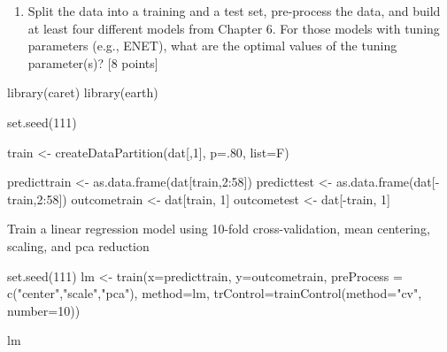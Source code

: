\documentclass[
]{article}
\newenvironment{Shaded}{\begin{snugshade}}{\end{snugshade}}
\newcommand{\AttributeTok}[1]{\textcolor[rgb]{0.77,0.63,0.00}{#1}}
\newcommand{\DecValTok}[1]{\textcolor[rgb]{0.00,0.00,0.81}{#1}}
\newcommand{\FunctionTok}[1]{\textcolor[rgb]{0.00,0.00,0.00}{#1}}
\newcommand{\NormalTok}[1]{#1}
\newcommand{\OtherTok}[1]{\textcolor[rgb]{0.56,0.35,0.01}{#1}}
\newcommand{\SpecialCharTok}[1]{\textcolor[rgb]{0.00,0.00,0.00}{#1}}
\newcommand{\StringTok}[1]{\textcolor[rgb]{0.31,0.60,0.02}{#1}}
\providecommand{\tightlist}{%
  \setlength{\itemsep}{0pt}\setlength{\parskip}{0pt}}
\begin{document}
\begin{enumerate}
\def\labelenumi{(\alph{enumi})}
\setcounter{enumi}{1}
\tightlist
\item
  Split the data into a training and a test set, pre-process the data,
  and build at least four different models from Chapter 6. For those
  models with tuning parameters (e.g., ENET), what are the optimal
  values of the tuning parameter(s)? {[}8 points{]}
\end{enumerate}

\begin{Shaded}
\begin{Highlighting}[]
\FunctionTok{library}\NormalTok{(caret)}
\FunctionTok{library}\NormalTok{(earth)}

\FunctionTok{set.seed}\NormalTok{(}\DecValTok{111}\NormalTok{)}

\NormalTok{train }\OtherTok{\textless{}{-}} \FunctionTok{createDataPartition}\NormalTok{(dat[,}\DecValTok{1}\NormalTok{], }\AttributeTok{p=}\NormalTok{.}\DecValTok{80}\NormalTok{, }\AttributeTok{list=}\NormalTok{F)}

\NormalTok{predicttrain }\OtherTok{\textless{}{-}} \FunctionTok{as.data.frame}\NormalTok{(dat[train,}\DecValTok{2}\SpecialCharTok{:}\DecValTok{58}\NormalTok{])}
\NormalTok{predicttest }\OtherTok{\textless{}{-}} \FunctionTok{as.data.frame}\NormalTok{(dat[}\SpecialCharTok{{-}}\NormalTok{train,}\DecValTok{2}\SpecialCharTok{:}\DecValTok{58}\NormalTok{])}
\NormalTok{outcometrain }\OtherTok{\textless{}{-}}\NormalTok{ dat[train, }\DecValTok{1}\NormalTok{]}
\NormalTok{outcometest }\OtherTok{\textless{}{-}}\NormalTok{ dat[}\SpecialCharTok{{-}}\NormalTok{train, }\DecValTok{1}\NormalTok{]}
\end{Highlighting}
\end{Shaded}

Train a linear regression model using 10-fold cross-validation, mean
centering, scaling, and pca reduction

\begin{Shaded}
\begin{Highlighting}[]
\FunctionTok{set.seed}\NormalTok{(}\DecValTok{111}\NormalTok{)}
\NormalTok{lm }\OtherTok{\textless{}{-}} \FunctionTok{train}\NormalTok{(}\AttributeTok{x=}\NormalTok{predicttrain,}
            \AttributeTok{y=}\NormalTok{outcometrain,}
            \AttributeTok{preProcess =} \FunctionTok{c}\NormalTok{(}\StringTok{"center"}\NormalTok{,}\StringTok{"scale"}\NormalTok{,}\StringTok{"pca"}\NormalTok{),}
            \AttributeTok{method=}\StringTok{\textquotesingle{}lm\textquotesingle{}}\NormalTok{,}
            \AttributeTok{trControl=}\FunctionTok{trainControl}\NormalTok{(}\AttributeTok{method=}\StringTok{"cv"}\NormalTok{, }\AttributeTok{number=}\DecValTok{10}\NormalTok{))}

\NormalTok{lm}
\end{Highlighting}
\end{Shaded}
\end{document}
